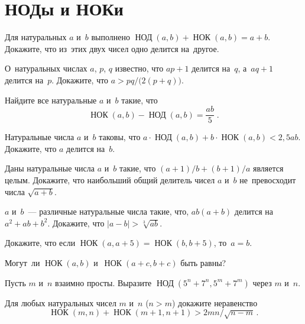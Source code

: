 
\section*{НОДы и НОКи}


\begingroup
    \def\abs#1{\lvert #1 \rvert}
    \def\GCD{\operatorname{\text{НОД}}}
    \def\LCM{\operatorname{\text{НОК}}}

\begin{problems}

\item
Для натуральных $a$ и~$b$ выполнено
$\GCD(a, b) + \LCM(a, b) = a + b$.
Докажите, что из~этих двух чисел одно делится на~другое.

\item
О~натуральных числах $a$, $p$, $q$ известно, что $a p + 1$ делится на~$q$,
а~$a q + 1$ делится на~$p$.
Докажите, что
\(
    a > p q / \bigl(2 (p + q) \bigr)
\).

\item
Найдите все натуральные $a$ и~$b$ такие, что
\[
    \LCM(a, b) - \GCD(a, b)
=
    \frac{a b}{5}
\; . \]

\item
Натуральные числа $a$ и~$b$ таковы, что
$a \cdot \GCD(a, b) + b \cdot \LCM(a, b) < 2{,}5 a b$.
Докажите, что $a$ делится на~$b$.

\item
Даны натуральные числа $a$ и~$b$ такие, что $(a + 1) / b + (b + 1) / a$
является целым.
Докажите, что наибольший общий делитель чисел $a$ и~$b$ не~превосходит числа
$\sqrt{a + b}$.

\item
$a$ и~$b$~--- различные натуральные числа такие, что, $a b (a + b)$ делится
на~$a^2 + a b + b^2$.
Докажите, что $\abs{a - b} > \sqrt[3]{a b}$.

\item
Докажите, что если $\LCM(a, a + 5) = \LCM(b, b + 5)$, то~$a = b$.

\item
Могут~ли $\LCM(a, b)$ и~$\LCM(a + c, b + c)$ быть равны?

\item
Пусть $m$ и~$n$ взаимно просты.
Выразите $\GCD(5^{n} + 7^{n}, 5^{m} + 7^{m})$ через $m$ и~$n$.

\item
Для любых натуральных чисел $m$ и~$n$ ($n > m$) докажите неравенство
\[
    \LCM(m, n) + \LCM(m + 1, n + 1) > 2 m n / \sqrt{n - m}
\, . \]

\end{problems}

\endgroup %

